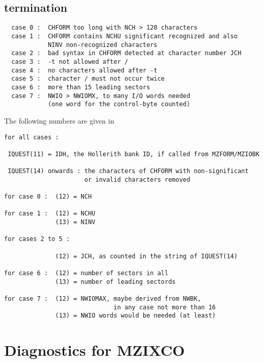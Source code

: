 \begin{flushleft}
\\
\\
\end{flushleft}

\subsection*{ termination}

\begin{verbatim}
  case 0 :  CHFORM too long with NCH > 120 characters
  case 1 :  CHFORM contains NCHU significant recognized and also
            NINV non-recognized characters
  case 2 :  bad syntax in CHFORM detected at character number JCH
  case 3 :  -t not allowed after /
  case 4 :  no characters allowed after -t
  case 5 :  character / must not occur twice
  case 6 :  more than 15 leading sectors
  case 7 :  NWIO > NWIOMX, to many I/O words needed
            (one word for the control-byte counted)
\end{verbatim}

The following numbers are given in 

\begin{verbatim}
for all cases :

 IQUEST(11) = IDH, the Hollerith bank ID, if called from MZFORM/MZIOBK

 IQUEST(14) onwards : the characters of CHFORM with non-significant
                      or invalid characters removed

for case 0 :  (12) = NCH

for case 1 :  (12) = NCHU
              (13) = NINV

for cases 2 to 5 :

              (12) = JCH, as counted in the string of IQUEST(14)

for case 6 :  (12) = number of sectors in all
              (13) = number of leading sectords

for case 7 :  (12) = NWIOMAX, maybe derived from NWBK,
                              in any case not more than 16
              (13) = NWIO words would be needed (at least)
\end{verbatim}

\section{Diagnostics for MZIXCO}

